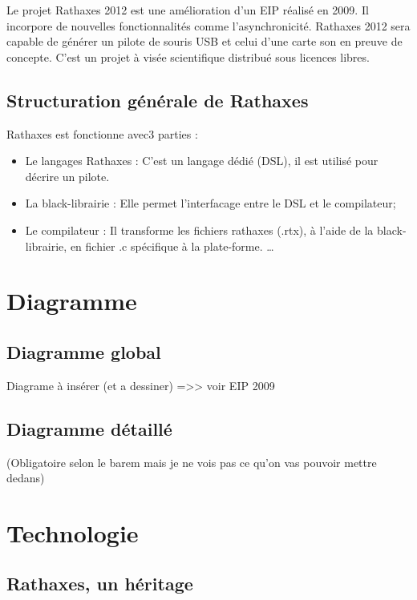 \documentclass{rtxreport}
\begin{document}
Le projet Rathaxes 2012 est une amélioration d'un EIP réalisé en 2009. Il
incorpore de nouvelles fonctionnalités comme l’asynchronicité. Rathaxes 2012
sera capable de générer un pilote de souris USB et celui d'une carte son en
preuve de concepte.  C'est un projet à visée scientifique distribué sous
licences libres.


\section{Structuration générale de Rathaxes}

Rathaxes est fonctionne avec3 parties :

\begin{itemize}
        \item Le langages Rathaxes : C'est un langage dédié (DSL),
            il est utilisé pour décrire un pilote.
        \item La black-librairie :  Elle permet l'interfacage entre le DSL
            et le compilateur;
        \item Le compilateur : Il transforme les fichiers rathaxes (.rtx),
            à l'aide de la black-librairie, en fichier .c spécifique à la
            plate-forme. \ldots
\end{itemize}

\chapter{Diagramme}

\section{Diagramme global}

Diagrame à insérer (et a dessiner) 
=>> voir EIP 2009


\section{Diagramme détaillé}

(Obligatoire selon le barem mais je ne vois pas ce qu'on vas pouvoir
mettre dedans)

\chapter{Technologie}

\section{Rathaxes, un héritage}
\end{document}
